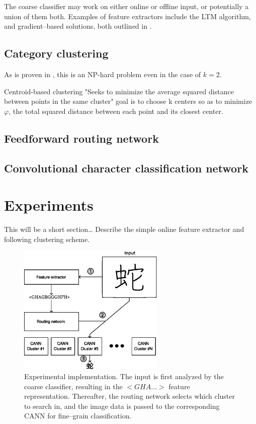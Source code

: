 \documentclass[10pt,conference,a4paper]{IEEEtran}
\begin{document}
	The coarse classifier may work on either online or offline input, or potentially a union of them both.
	Examples of feature extractors include the LTM algorithm, and gradient--based solutions, both outlined in \cite{tanaka1999hybrid}.



	\subsection{Category clustering}

	As is proven in \cite{drineas2004clustering}, this is an NP-hard problem even in the case of $k = 2$. 

	Centroid-based clustering
	"Seeks to minimize the average squared distance between points in the same cluster"
	goal is to choose k centers so as to minimize $\varphi$, the total squared distance between each point and its closest center.

	\subsection{Feedforward routing network}


	\subsection{Convolutional character classification network}


	\section{Experiments}
	\label{sec:experiments}

	This will be a short section\ldots
	Describe the simple online feature extractor and following clustering scheme.

	\begin{figure}
		\centering
		\includegraphics[width=2.75in]{./fig/experimental-implementation.eps}
		\caption{Experimental implementation. The input is first analyzed by the coarse classifier, resulting in the $<GHA\ldots>$ feature representation.
		Thereafter, the routing network selects which cluster to search in, and the image data is passed to the corresponding CANN for fine--grain classification.}
		\label{fig_experimental_implementation}
	\end{figure}
\end{document}
